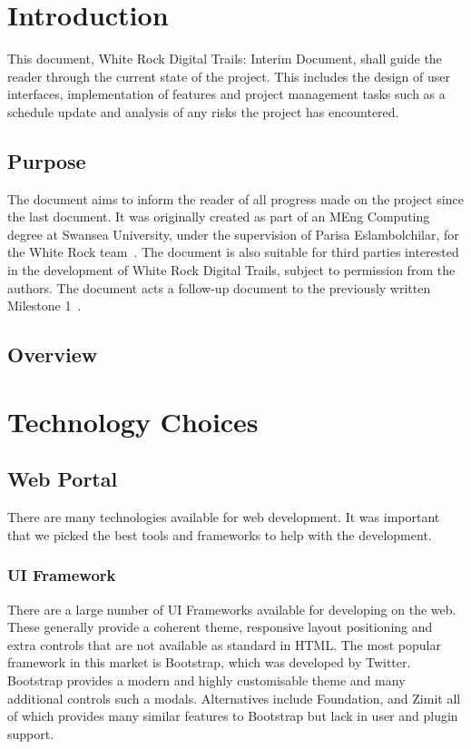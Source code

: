 \documentclass[11pt,a4paper]{article}
\begin{document}


\newpage
\setcounter{page}{1}
\tableofcontents

\newpage
\setcounter{page}{1}
\section{Introduction}
This document, White Rock Digital Trails: Interim Document, shall guide the reader through the current state of the project. This includes the design of user interfaces, implementation of features and project management tasks such as a schedule update and analysis of any risks the project has encountered.
\subsection{Purpose}
The document aims to inform the reader of all progress made on the project since the last document. It was originally created as part of an MEng Computing degree at Swansea University, under the supervision of Parisa Eslambolchilar, for the White Rock team~\cite{whiterock}. The document is also suitable for third parties interested in the development of White Rock Digital Trails, subject to permission from the authors. The document acts a follow-up document to the previously written Milestone 1~\cite{initialDoc}.
\subsection{Overview}

\section{Technology Choices}
\subsection{Web Portal}
There are many technologies available for web development. It was important that we picked the best tools and frameworks to help with the development.

\subsubsection{UI Framework}
There are a large number of UI Frameworks available for developing on the web. These generally provide a coherent theme, responsive layout positioning and extra controls that are not available as standard in HTML. The most popular framework in this market is Bootstrap\cite{bootstrap}, which was developed by Twitter. Bootstrap provides a modern and highly customisable theme and many additional controls such a modals. Alternatives include Foundation\cite{foundation}, and Zimit\cite{zimit} all of which provides many similar features to Bootstrap but lack in user and plugin support.
\end{document}
